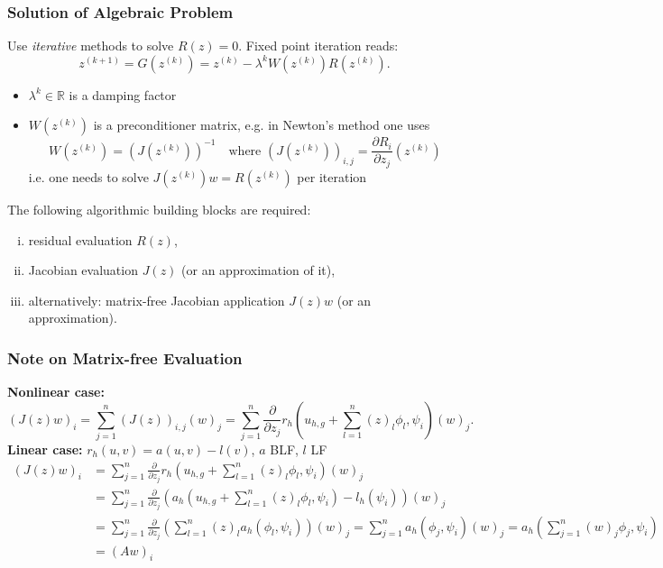 \documentclass[aspectratio=169,11pt]{beamer}
\theoremstyle{definition}
\begin{document}
\begin{frame}
\frametitle{Solution of Algebraic Problem}
Use {\em iterative} methods to solve $R(z)=0$. Fixed point iteration reads:
\begin{equation}
z^{(k+1)} = G(z^{(k)}) = z^{(k)} - \lambda^{k} W(z^{(k)}) R(z^{(k)}) .
\end{equation}
\vspace{-5mm}
\begin{itemize}
\item $\lambda^{k}\in\mathbb{R}$ is a damping factor
\item $W(z^{(k)})$ is a preconditioner matrix, e.g. in Newton's method one uses
\begin{equation*}
W(z^{(k)}) = (J(z^{(k)}))^{-1} \quad \text{where $(J(z^{(k)}))_{i,j} = \frac{\partial R_i}{\partial z_j}
(z^{(k)})$}
\end{equation*}
i.e. one needs to solve $J\left(z^{(k)}\right) w = R(z^{(k)})$ per iteration
\end{itemize}
The following algorithmic building blocks are required:
\begin{enumerate}[i)]
\item residual evaluation $R(z)$,
\item Jacobian evaluation $J(z)$ (or an approximation of it),
\item alternatively: matrix-free Jacobian application $J(z) w$ (or an approximation).
\end{enumerate}
\end{frame}

\begin{frame}
\frametitle{Note on Matrix-free Evaluation}
\textbf{Nonlinear case:}
\begin{equation*}
(J(z) w)_i = \sum_{j=1}^n (J(z))_{i,j} (w)_j = \sum_{j=1}^n
\frac{\partial}{\partial z_j} r_h\left(u_{h,g}+\sum_{l=1}^n (z)_l  \phi_l,\psi_i\right) (w)_j .
\end{equation*}
\textbf{Linear case:} $r_h(u,v)=a(u,v)-l(v)$, $a$ BLF, $l$ LF
\begin{equation*}
\begin{split}
(J(z) w)_i &= \sum_{j=1}^n
\frac{\partial}{\partial z_j} r_h\left(u_{h,g}+\sum_{l=1}^n (z)_l  \phi_l,\psi_i\right) (w)_j \\
&= \sum_{j=1}^n \frac{\partial}{\partial z_j} \left(
a_h\left(u_{h,g}+\sum_{l=1}^n (z)_l  \phi_l,\psi_i\right) - l_h(\psi_i)\right) (w)_j \\
&= \sum_{j=1}^n \frac{\partial}{\partial z_j} \left(
\sum_{l=1}^n (z)_l a_h(\phi_l,\psi_i) \right)  (w)_j 
= \sum_{j=1}^n a_h(\phi_j,\psi_i) (w)_j =
a_h\left( \sum_{j=1}^n (w)_j \phi_j,\psi_i\right) \\
&= (A w)_i
\end{split}
\end{equation*}
\end{frame}
\end{document}
